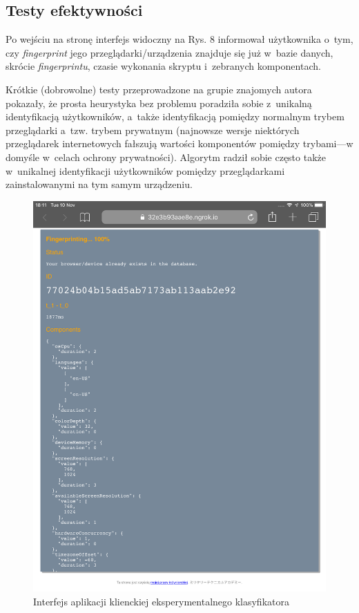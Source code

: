 \subsection{Testy efektywności}
Po wejściu na stronę interfejs widoczny na Rys. 8 informował użytkownika o~tym,
czy \emph{fingerprint} jego przeglądarki/urządzenia znajduje się już w~bazie
danych, skrócie \emph{fingerprintu}, czasie wykonania skryptu i~zebranych
komponentach.

Krótkie (dobrowolne) testy przeprowadzone na grupie znajomych autora pokazały,
że prosta heurystyka bez problemu poradziła sobie z~unikalną identyfikacją
użytkowników, a~także identyfikacją pomiędzy normalnym trybem przeglądarki
a~tzw. trybem prywatnym (najnowsze wersje niektórych przeglądarek internetowych
fałszują wartości komponentów pomiędzy trybami---w domyśle w~celach ochrony
prywatności). Algorytm radził sobie często także w~unikalnej identyfikacji
użytkowników pomiędzy przeglądarkami zainstalowanymi na tym samym urządzeniu.

\begin{figure}
	\includegraphics[width=\textwidth,keepaspectratio]{img/10}
	\caption{Interfejs aplikacji klienckiej eksperymentalnego klasyfikatora}
\end{figure}

